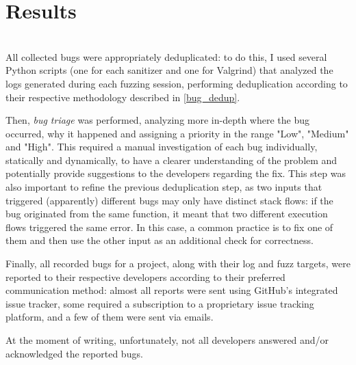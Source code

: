 \chapter{Results} \label{chap_4}
\ \\

All collected bugs were appropriately deduplicated: to do this, I used several Python scripts (one for each sanitizer and one for Valgrind) that analyzed the logs generated during each fuzzing session, performing deduplication according to their respective methodology described in \ref{bug_dedup}.

Then, \textit{bug triage} was performed, analyzing more in-depth where the bug occurred, why it happened and assigning a priority in the range "Low", "Medium" and "High". This required a manual investigation of each bug individually, statically and dynamically, to have a clearer understanding of the problem and potentially provide suggestions to the developers regarding the fix.
This step was also important to refine the previous deduplication step, as two inputs that triggered (apparently) different bugs may only have distinct stack flows: if the bug originated from the same function, it meant that two different execution flows triggered the same error. In this case, a common practice is to fix one of them and then use the other input as an additional check for correctness.

Finally, all recorded bugs for a project, along with their log and fuzz targets, were reported to their respective developers according to their preferred communication method: almost all reports were sent using GitHub's integrated issue tracker, some required a subscription to a proprietary issue tracking platform, and a few of them were sent via emails.
\newline

At the moment of writing, unfortunately, not all developers answered and/or acknowledged the reported bugs.



\newpage
